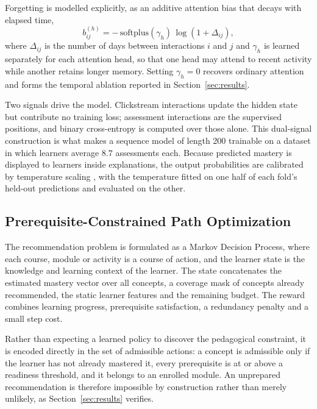 Forgetting is modelled explicitly, as an additive attention bias that decays with elapsed
time,
%
\begin{equation}
b^{(h)}_{ij} = -\,\mathrm{softplus}(\gamma_h)\,\log(1 + \Delta_{ij}),
\label{eq:decay}
\end{equation}
%
where $\Delta_{ij}$ is the number of days between interactions $i$ and $j$ and $\gamma_h$
is learned separately for each attention head, so that one head may attend to recent
activity while another retains longer memory. Setting $\gamma_h = 0$ recovers ordinary
attention and forms the temporal ablation reported in Section~\ref{sec:results}.

Two signals drive the model. Clickstream interactions update the hidden state but
contribute no training loss; assessment interactions are the supervised positions, and
binary cross-entropy is computed over those alone. This dual-signal construction is what
makes a sequence model of length 200 trainable on a dataset in which learners average
$8.7$ assessments each. Because predicted mastery is displayed to learners inside
explanations, the output probabilities are calibrated by temperature scaling
\cite{guo2017calibration}, with the temperature fitted on one half of each fold's
held-out predictions and evaluated on the other.


\subsection{Prerequisite-Constrained Path Optimization}

The recommendation problem is formulated as a Markov Decision Process, where each course,
module or activity is a course of action, and the learner state is the knowledge and
learning context of the learner. The state concatenates the estimated mastery vector over
all concepts, a coverage mask of concepts already recommended, the static learner features
and the remaining budget. The reward combines learning progress, prerequisite
satisfaction, a redundancy penalty and a small step cost.

Rather than expecting a learned policy to discover the pedagogical constraint, it is
encoded directly in the set of admissible actions: a concept is admissible only if the
learner has not already mastered it, every prerequisite is at or above a readiness
threshold, and it belongs to an enrolled module. An unprepared recommendation is therefore
impossible by construction rather than merely unlikely, as Section~\ref{sec:results}
verifies.

